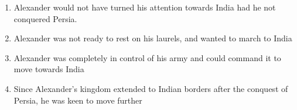 \documentclass[journal,12pt,onecolumn]{IEEEtran}
\theoremstyle{remark}
\begin{document}
\begin{enumerate}
				\hfill{}
				
				\begin{enumerate}
					\item Alexander would not have turned his attention towards India had he not conquered Persia.
					\item Alexander was not ready to rest on his laurels, and wanted to march to India
					\item Alexander was completely in control of his army and could command it to move towards India
					\item Since Alexander's kingdom extended to Indian borders after the conquest of Persia, he was keen to move further
				\end{enumerate}
				
			\end{enumerate}
			\newpage
			
\end{document}
